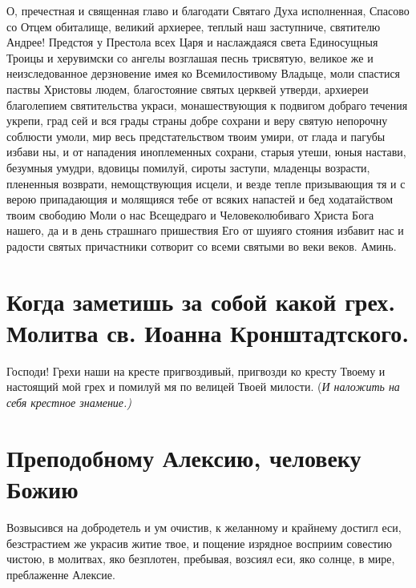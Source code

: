 О, пречестная и священная главо и благодати Святаго Духа исполненная, Спасово со Отцем обиталище, великий архиерее, теплый наш заступниче, святителю Андрее! Предстоя у Престола всех Царя и наслаждаяся света Единосущныя Троицы и херувимски со ангелы возглашая песнь трисвятую, великое же и неизследованное дерзновение имея ко Всемилостивому Владыце, моли спастися паствы Христовы людем, благостояние святых церквей утверди, архиереи благолепием святительства украси, монашествующия к подвигом добраго течения укрепи, град сей и вся грады страны добре сохрани и веру святую непорочну соблюсти умоли, мир весь предстательством твоим умири, от глада и пагубы избави ны, и от нападения иноплеменных сохрани, старыя утеши, юныя настави, безумныя умудри, вдовицы помилуй, сироты заступи, младенцы возрасти, плененныя возврати, немощствующия исцели, и везде тепле призывающия тя и с верою припадающия и молящияся тебе от всяких напастей и бед ходатайством твоим свободию Моли о нас Всещедраго и Человеколюбиваго Христа Бога нашего, да и в день страшнаго пришествия Его от шуияго стояния избавит нас и радости святых причастники сотворит со всеми святыми во веки веков. Аминь.


\section{Когда заметишь за собой какой грех. Молитва св. Иоанна Кронштадтского.}
 


Господи! Грехи наши на кресте пригвоздивый, пригвозди ко кресту Твоему и настоящий мой грех и помилуй мя по велицей Твоей милости. (\itshape И наложить на себя крестное знамение.\normalfont{})
\mychapterending


 
\vspace{-\baselineskip}
\section{Преподобному Алексию, человеку Божию}
 




Возвысився на добродетель и ум очистив, к желанному и крайнему достигл еси, безстрастием же украсив житие твое, и пощение изрядное восприим совестию чистою, в молитвах, яко безплотен, пребывая, возсиял еси, яко солнце, в мире, преблаженне Алексие.



